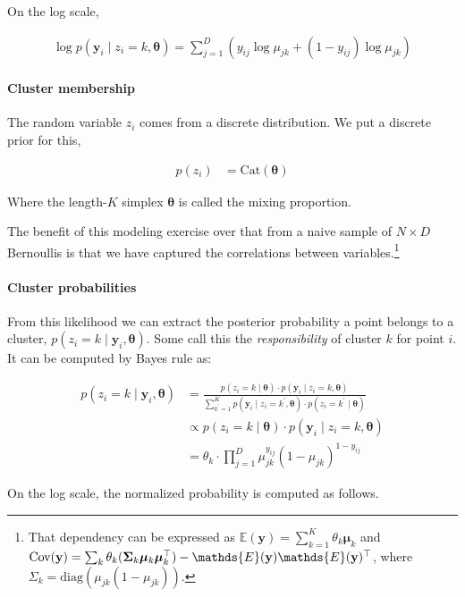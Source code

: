 \documentclass[12pt,letterpaper]{article}
\numberwithin{equation}{section}
\newcommand{\cov}{\textnormal{Cov}}
\newcommand{\bth}{\bm{\theta}}
\newcommand{\bmu}{\bm{\mu}}
\newcommand{\by}{\mathbf{y}}
\begin{document}
On the log scale,

\begin{align}
\log p(\by_{i} \mid z_{i} = k, \bth) = \sum_{j=1}^{D}(y_{ij}\log\mu_{jk} + (1 - y_{ij})\log\mu_{jk})
\end{align}

\paragraph{Cluster membership}

The random variable \(z_i\) comes from a discrete distribution. We put a
discrete prior for this,

\begin{align}
p(z_i) &= \text{Cat}(\bth)
\end{align}

Where the length-\(K\) simplex \(\bth\) is called the mixing proportion.

The benefit of this modeling exercise over that from a naive sample of
\(N \times D\) Bernoullis is that we have captured the correlations
between
variables.\footnote{That dependency can be expressed as \(\mathds{E}(\by) = \sum_{k = 1}^{K} \theta_{k} \bmu_{k}\) and 
\(\cov({\by}) = \sum_{k} \theta_{k} (\mathbf{\Sigma}_k \bmu_k\bmu_{k}^{\top}) - \mathds{E}(\by)\mathds{E}(\by)^\top\), where \(\Sigma_k = \text{diag}(\mu_{jk}(1 - \mu_{jk}))\).}

\paragraph{Cluster probabilities}

From this likelihood we can extract the posterior probability a point
belongs to a cluster, \(p(z_i = k \mid \by_i, \bth)\). Some call this
the \emph{responsibility} of cluster \(k\) for point \(i\). It can be
computed by Bayes rule as:

\begin{align}
p(z_i = k \mid \by_{i}, \bth) &=  \frac{p(z_i = k \mid \bth)\cdot p(\by_{i} \mid z_i = k, \bth)}{\sum^{K}_{k^\prime = 1} p(\by_{i} \mid z_i = k^\prime, \bth) \cdot p(z_i = k^\prime \mid \bth)}\\
&\propto p(z_i = k \mid \bth)\cdot p(\by_{i} \mid z_i = k, \bth)\\
&=  \theta_k\cdot\prod^{D}_{j=1}\mu_{jk}^{y_{ij}}(1 - \mu_{jk})^{1 - y_{ij}}
\end{align}

On the log scale, the normalized probability is computed as follows.
\end{document}
